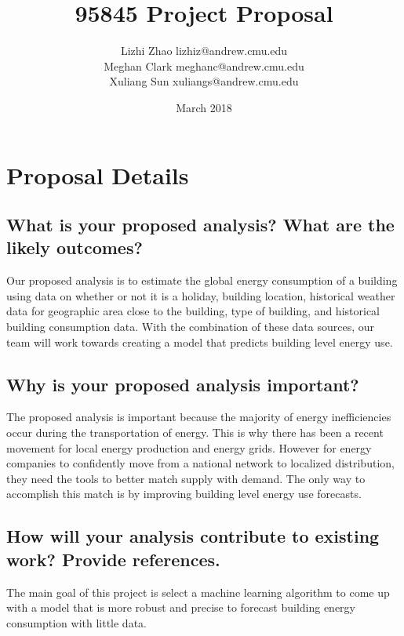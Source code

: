 \documentclass{article}
\begin{document}
\title{95845 Project Proposal}
\author{\name Lizhi Zhao \email lizhiz@andrew.cmu.edu \\
       \AND
       \name Meghan Clark \email meghanc@andrew.cmu.edu\\
       \AND
       \name Xuliang Sun \email xuliangs@andrew.cmu.edu}
\date{March 2018}
\maketitle

\section{Proposal Details} \label{details}

\subsection{What is your proposed analysis? What are the likely outcomes?}
Our proposed analysis is to estimate the global energy consumption of a building using data on whether or not it is a holiday, building location, historical weather data for geographic area close to the building, type of building, and historical building consumption data. 
With the combination of these data sources, our team will work towards creating a model that predicts building level energy use. 


\subsection{Why is your proposed analysis important?}
The proposed analysis is important because the majority of energy inefficiencies occur during the transportation of energy. This is why there has been a recent movement for local energy production and energy grids. However for energy companies to confidently move from a national network to localized distribution, they  need the tools to better match supply with demand. The only way to accomplish this match is by improving building level energy use forecasts. 

\subsection{How will your analysis contribute to existing work? Provide references.}
The main goal of this project is select a machine learning algorithm to come up with
a model that is more robust and precise to forecast building energy consumption with
little data.
\end{document}
